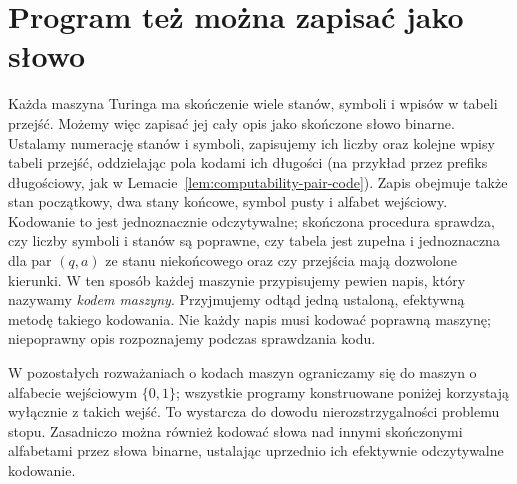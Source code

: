 \section{Program też można zapisać jako słowo}
Każda maszyna Turinga ma skończenie wiele stanów,
symboli i wpisów w tabeli przejść. Możemy więc
zapisać jej cały opis jako skończone słowo binarne.
Ustalamy numerację stanów i symboli, zapisujemy ich liczby
oraz kolejne wpisy tabeli przejść, oddzielając pola kodami
ich długości (na przykład przez prefiks długościowy,
jak w Lemacie~\ref{lem:computability-pair-code}).
Zapis obejmuje także stan początkowy, dwa stany końcowe,
symbol pusty i alfabet wejściowy. Kodowanie to jest
jednoznacznie odczytywalne; skończona procedura sprawdza,
czy liczby symboli i stanów są poprawne, czy tabela jest
zupełna i jednoznaczna dla par $(q,a)$ ze stanu niekońcowego
oraz czy przejścia mają dozwolone kierunki.
W ten sposób każdej maszynie przypisujemy pewien napis,
który nazywamy \emph{kodem maszyny}. Przyjmujemy odtąd
jedną ustaloną, efektywną metodę takiego kodowania.
Nie każdy napis musi kodować poprawną maszynę;
niepoprawny opis rozpoznajemy podczas sprawdzania kodu.

W pozostałych rozważaniach o kodach maszyn ograniczamy się do
maszyn o alfabecie wejściowym $\{0,1\}$; wszystkie programy
konstruowane poniżej korzystają wyłącznie z takich wejść.
To wystarcza do dowodu nierozstrzygalności problemu stopu.
Zasadniczo można również kodować słowa nad innymi skończonymi
alfabetami przez słowa binarne, ustalając uprzednio ich
efektywnie odczytywalne kodowanie.

